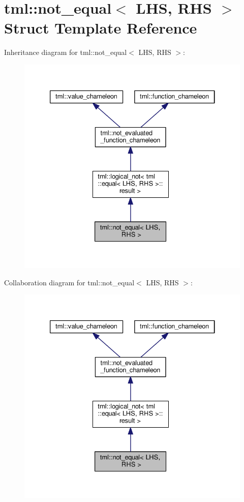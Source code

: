 \hypertarget{structtml_1_1not__equal}{\section{tml\+:\+:not\+\_\+equal$<$ L\+H\+S, R\+H\+S $>$ Struct Template Reference}
\label{structtml_1_1not__equal}
}


Inheritance diagram for tml\+:\+:not\+\_\+equal$<$ L\+H\+S, R\+H\+S $>$\+:
\nopagebreak
\begin{figure}[H]
\begin{center}
\leavevmode
\includegraphics[width=333pt]{structtml_1_1not__equal__inherit__graph}
\end{center}
\end{figure}


Collaboration diagram for tml\+:\+:not\+\_\+equal$<$ L\+H\+S, R\+H\+S $>$\+:
\nopagebreak
\begin{figure}[H]
\begin{center}
\leavevmode
\includegraphics[width=333pt]{structtml_1_1not__equal__coll__graph}
\end{center}
\end{figure}
